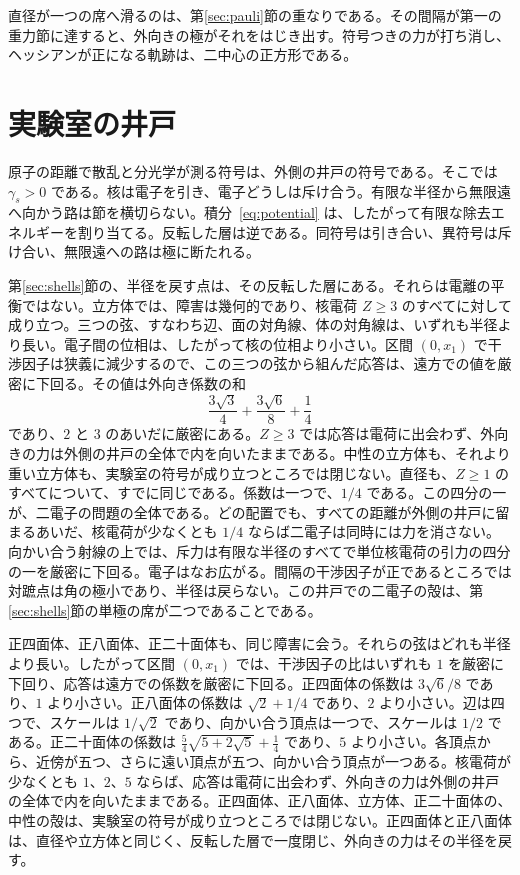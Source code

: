 \documentclass[a4paper]{article}
\begin{document}
直径が一つの席へ滑るのは、第\ref{sec:pauli}節の重なりである。その間隔が第一の重力節に達すると、外向きの極がそれをはじき出す。符号つきの力が打ち消し、ヘッシアンが正になる軌跡は、二中心の正方形である。

\section{実験室の井戸}
\label{sec:lab}

原子の距離で散乱と分光学が測る符号は、外側の井戸の符号である。そこでは \(\gamma_s>0\) である。核は電子を引き、電子どうしは斥け合う。有限な半径から無限遠へ向かう路は節を横切らない。積分~\eqref{eq:potential} は、したがって有限な除去エネルギーを割り当てる。反転した層は逆である。同符号は引き合い、異符号は斥け合い、無限遠への路は極に断たれる。

第\ref{sec:shells}節の、半径を戻す点は、その反転した層にある。それらは電離の平衡ではない。立方体では、障害は幾何的であり、核電荷 \(Z\ge 3\) のすべてに対して成り立つ。三つの弦、すなわち辺、面の対角線、体の対角線は、いずれも半径より長い。電子間の位相は、したがって核の位相より小さい。区間 \((0,x_1)\) で干渉因子は狭義に減少するので、この三つの弦から組んだ応答は、遠方での値を厳密に下回る。その値は外向き係数の和
\[
\frac{3\sqrt{3}}{4}+\frac{3\sqrt{6}}{8}+\frac14
\]
であり、\(2\) と \(3\) のあいだに厳密にある。\(Z\ge 3\) では応答は電荷に出会わず、外向きの力は外側の井戸の全体で内を向いたままである。中性の立方体も、それより重い立方体も、実験室の符号が成り立つところでは閉じない。直径も、\(Z\ge 1\) のすべてについて、すでに同じである。係数は一つで、\(1/4\) である。この四分の一が、二電子の問題の全体である。どの配置でも、すべての距離が外側の井戸に留まるあいだ、核電荷が少なくとも \(1/4\) ならば二電子は同時には力を消さない。向かい合う射線の上では、斥力は有限な半径のすべてで単位核電荷の引力の四分の一を厳密に下回る。電子はなお広がる。間隔の干渉因子が正であるところでは対蹠点は角の極小であり、半径は戻らない。この井戸での二電子の殻は、第\ref{sec:shells}節の単極の席が二つであることである。

正四面体、正八面体、正二十面体も、同じ障害に会う。それらの弦はどれも半径より長い。したがって区間 \((0,x_1)\) では、干渉因子の比はいずれも \(1\) を厳密に下回り、応答は遠方での係数を厳密に下回る。正四面体の係数は \(3\sqrt{6}/8\) であり、\(1\) より小さい。正八面体の係数は \(\sqrt{2}+1/4\) であり、\(2\) より小さい。辺は四つで、スケールは \(1/\sqrt{2}\) であり、向かい合う頂点は一つで、スケールは \(1/2\) である。正二十面体の係数は \(\frac54\sqrt{5+2\sqrt{5}}+\frac14\) であり、\(5\) より小さい。各頂点から、近傍が五つ、さらに遠い頂点が五つ、向かい合う頂点が一つある。核電荷が少なくとも \(1\)、\(2\)、\(5\) ならば、応答は電荷に出会わず、外向きの力は外側の井戸の全体で内を向いたままである。正四面体、正八面体、立方体、正二十面体の、中性の殻は、実験室の符号が成り立つところでは閉じない。正四面体と正八面体は、直径や立方体と同じく、反転した層で一度閉じ、外向きの力はその半径を戻す。
\end{document}
